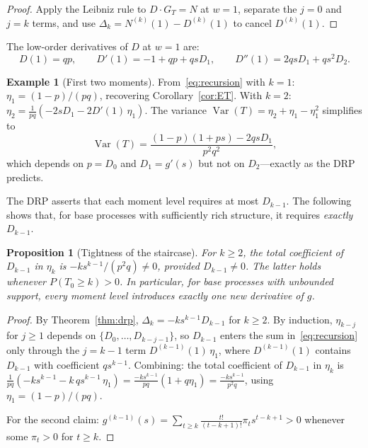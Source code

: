 \documentclass[11pt]{article}
\theoremstyle{plain}
\newtheorem{proposition}[theorem]{Proposition}
\theoremstyle{definition}
\newtheorem{example}[theorem]{Example}
\theoremstyle{remark}
\DeclareMathOperator{\Var}{Var}
\begin{document}
\begin{proof}
Apply the Leibniz rule to $D \cdot G_T = N$ at $w = 1$, separate the $j = 0$ and $j = k$ terms, and use $\Delta_k = N^{(k)}(1) - D^{(k)}(1)$ to cancel $D^{(k)}(1)$.
\end{proof}

The low-order derivatives of $D$ at $w = 1$ are:
\begin{equation}\label{eq:D-derivs}
  D(1) = qp, \qquad
  D'(1) = -1 + qp + qsD_1, \qquad
  D''(1) = 2qsD_1 + qs^2 D_2.
\end{equation}

\begin{example}[First two moments]\label{ex:moments}
From~\eqref{eq:recursion} with $k = 1$: $\eta_1 = (1-p)/(pq)$, recovering Corollary~\ref{cor:ET}.  With $k = 2$: $\eta_2 = \frac{1}{pq}(-2sD_1 - 2D'(1)\,\eta_1)$.  The variance $\Var(T) = \eta_2 + \eta_1 - \eta_1^2$ simplifies to
\begin{equation}\label{eq:var}
  \Var(T) = \frac{(1-p)(1+ps) - 2qsD_1}{p^2 q^2},
\end{equation}
which depends on $p = D_0$ and $D_1 = g'(s)$ but not on $D_2$---exactly as the DRP predicts.
\end{example}

The DRP asserts that each moment level requires at most $D_{k-1}$.  The following shows that, for base processes with sufficiently rich structure, it requires \emph{exactly} $D_{k-1}$.

\begin{proposition}[Tightness of the staircase]\label{prop:tight}
For $k \geq 2$, the total coefficient of $D_{k-1}$ in $\eta_k$ is $-ks^{k-1}/(p^2 q) \neq 0$, provided $D_{k-1} \neq 0$.  The latter holds whenever $P(T_0 \geq k) > 0$.  In particular, for base processes with unbounded support, every moment level introduces exactly one new derivative of $g$.
\end{proposition}

\begin{proof}
By Theorem~\ref{thm:drp}, $\Delta_k = -ks^{k-1} D_{k-1}$ for $k \geq 2$.  By induction, $\eta_{k-j}$ for $j \geq 1$ depends on $\{D_0, \ldots, D_{k-j-1}\}$, so $D_{k-1}$ enters the sum in~\eqref{eq:recursion} only through the $j = k-1$ term $D^{(k-1)}(1)\,\eta_1$, where $D^{(k-1)}(1)$ contains $D_{k-1}$ with coefficient $qs^{k-1}$.  Combining: the total coefficient of $D_{k-1}$ in $\eta_k$ is $\frac{1}{pq}(-ks^{k-1} - k\,qs^{k-1}\,\eta_1) = \frac{-ks^{k-1}}{pq}(1 + q\eta_1) = \frac{-ks^{k-1}}{p^2 q}$, using $\eta_1 = (1-p)/(pq)$.

For the second claim: $g^{(k-1)}(s) = \sum_{t \geq k} \frac{t!}{(t-k+1)!} \pi_t s^{t-k+1} > 0$ whenever some $\pi_t > 0$ for $t \geq k$.
\end{proof}
\end{document}

